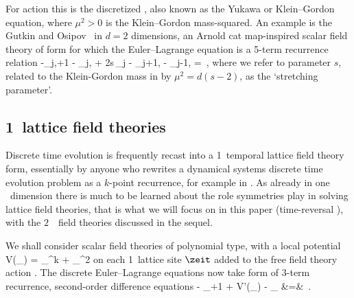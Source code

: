 For action  this is the discretized
{\sPe}, also known as the {Yukawa} or Klein–Gordon
equation, where  ${\mu}^2>0$ is the Klein–Gordon mass-squared.
An example is the Gutkin and Osipov \catlatt\ in  $d=2$
dimensions, an Arnold cat map-inspired scalar field theory  of
form  for which the Euler–\-Lagrange
equation  is a 5-term recurrence relation
\beq
      -\ssp_{j,\zeit+1} - \ssp_{j,}
+ 2{s}\,\ssp_{j\zeit}
     - \ssp_{j+1,\zeit} - \ssp_{j-1, \zeit}
     =  
\,,
where we refer to parameter ${s}$, related to the Klein-Gordon mass in
 by ${\mu}^2=d({s}-2)$, as the `stretching
parameter'.

\subsection{1\dmn\ lattice field theories}
\label{s:LC21FT1d}

Discrete time evolution is frequently recast into a 1\dmn\ temporal
lattice field theory form, essentially by anyone who rewrites a
dynamical systems discrete time evolution problem as a $k$-point recurrence,
for example in
.
As already in one \spt\ dimension there is much to be learned about the
role symmetries play in solving lattice field theories, that is what we
will focus on in this paper (time-reversal
), with the $2$\dmn\ \spt\ field
theories discussed in the sequel.

We shall consider scalar field theories of polynomial type, with a local
potential%
\beq
V(\ssp_\zeit) = \ssp_{\zeit}^k + \ssp_{\zeit}^2
on each  1\dmn\ lattice site $\zeit$ added to the free field theory
action . The discrete Euler–Lagrange equations
 now take form of 3-term recurrence, second-order
difference equations
\bea
- \ssp_{\zeit+1} + V'(\ssp_{\zeit}) - \ssp_{}
    &=&
\Ssym{\zeit}
\,.  %
\label{LC21:1dTempFT}%
\eea

